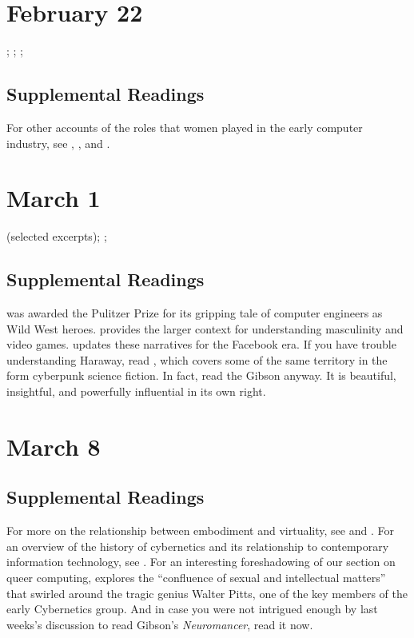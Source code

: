 \documentclass[11pt]{article}
\begin{document}
\section{February 22}

; ; ;

\subsection{Supplemental Readings}

For other accounts of the roles that women played in the early computer industry, see \cite{Shetterly:2016vl}, \cite{Grier:2005tq}, and \cite{Gurer:1996it}.

\section{March 1}

 (selected excerpts); 
; 

\subsection{Supplemental Readings}

\cite{Kidder:1981tj} was awarded the Pulitzer Prize for its gripping
tale of computer engineers as Wild West heroes. \cite{Kocurek:2015cg}
provides the larger context for understanding masculinity and video
games. \cite{Losse:2012um} updates these narratives for the Facebook
era. If you have trouble understanding Haraway, read
\cite{Gibson:1995un}, which covers some of the same territory in the
form cyberpunk science fiction. In fact, read the Gibson anyway. It is
beautiful, insightful, and powerfully influential in its own right.

\section{March 8}


\subsection{Supplemental Readings}

For more on the relationship between embodiment and virtuality, see \cite{Stone:1996wp} and \cite{Balsamo:1996uc}.  For an overview of the history of cybernetics and its relationship to contemporary information technology, see \cite{Kline:2015ti}.  For an interesting foreshadowing of our section on queer computing, \cite{Wilson:2009wm} explores the ``confluence of sexual and intellectual matters'' that swirled around the tragic genius Walter Pitts, one of the key members of the early Cybernetics group. And in case you were not intrigued enough by last weeks's discussion to read Gibson's \emph{Neuromancer}, read it now.
\end{document}
